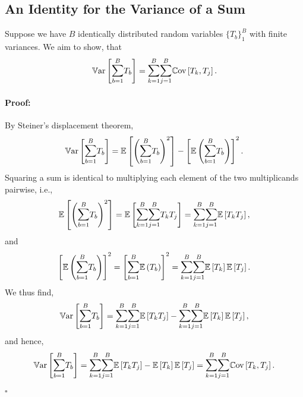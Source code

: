 \documentclass[a4paper,12pt, headsepline]{scrartcl}
\newenvironment{proof}{\paragraph{Proof:}}{\hfill$\square$}
\numberwithin{equation}{section}
\begin{document}
 \subsection{An Identity for the Variance of a Sum}\label{App:A4}
 Suppose we have $B$ identically distributed random variables $\{T_b\}_1^B$ with finite variances. We aim to show, that
 \[
\mathbb{V}\text{ar} \left[ \mathlarger{\sum}\limits_{b = 1}^B T_b \right]= \mathlarger{\sum}\limits_{k = 1}^B \mathlarger{\sum}\limits_{j = 1}^B \mathbb{C}\text{ov} \left[T_k, T_j \right].
 \]
 \begin{proof}
 	By Steiner's displacement theorem,
 	\[
 	\mathbb{V}\text{ar} \left[ \mathlarger{\sum}\limits_{b = 1}^B T_b \right] = \mathbb{E}\left[\left(\mathlarger{\sum}\limits_{b = 1}^B T_b\right)^2\right] - \left[\mathbb{E}\left(\mathlarger{\sum}\limits_{b = 1}^B T_b\right)\right]^2.
  	\]
  	Squaring a sum is identical to multiplying each element of the two multiplicands pairwise, i.e.,
  	\[
  	\mathbb{E}\left[\left(\mathlarger{\sum}\limits_{b = 1}^B T_b\right)^2\right] = 	\mathbb{E}\left[\mathlarger{\sum}\limits_{k = 1}^B \mathlarger{\sum}\limits_{j = 1}^B T_k T_j \right] = \mathlarger{\sum}\limits_{k = 1}^B \mathlarger{\sum}\limits_{j = 1}^B \mathbb{E}\left[T_k T_j\right], 
    \]
    and
    \[
    \left[\mathbb{E}\left(\mathlarger{\sum}\limits_{b = 1}^B T_b\right)\right]^2 = 
    \left[\mathlarger{\sum}\limits_{b = 1}^B \mathbb{E}\left(T_b\right)\right]^2 = 
    \mathlarger{\sum}\limits_{k = 1}^B \mathlarger{\sum}\limits_{j = 1}^B \mathbb{E}\left[T_k \right] \mathbb{E}\left[ T_j \right].
    \]
    We thus find,
    \[
    \mathbb{V}\text{ar} \left[ \mathlarger{\sum}\limits_{b = 1}^B T_b \right] =
    \mathlarger{\sum}\limits_{k = 1}^B \mathlarger{\sum}\limits_{j = 1}^B \mathbb{E}\left[T_k T_j\right] - \mathlarger{\sum}\limits_{k = 1}^B \mathlarger{\sum}\limits_{j = 1}^B \mathbb{E}\left[ T_k \right] \mathbb{E}\left[ T_j \right],
    \]
    and hence,
    \[
    \mathbb{V}\text{ar} \left[ \mathlarger{\sum}\limits_{b = 1}^B T_b \right] =
    \mathlarger{\sum}\limits_{k = 1}^B \mathlarger{\sum}\limits_{j = 1}^B \mathbb{E}\left[T_k T_j\right] - \mathbb{E}\left[ T_k \right] \mathbb{E}\left[ T_j \right] = \mathlarger{\sum}\limits_{k = 1}^B \mathlarger{\sum}\limits_{j = 1}^B \mathbb{C}\text{ov} \left[T_k, T_j \right].
    \]
 \end{proof}
\end{document}
